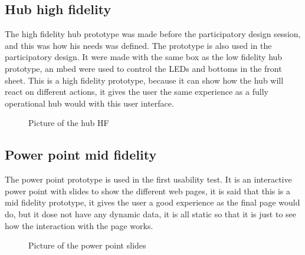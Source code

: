 \subsection{Hub high fidelity}
The high fidelity hub prototype was made before the participatory design session, and this was how his needs was defined. The prototype is also used in the participatory design. It were made with the same box as the low fidelity hub prototype, an mbed were used to control the LEDs and bottoms in the front sheet. This is a high fidelity prototype, because it can show how the hub will react on different actions, it gives the user the same experience as a fully operational hub would with this user interface.
\begin{figure}[H]
	\center
		\setlength\fboxsep{0pt}
		\setlength\fboxrule{1pt}
   	\caption{Picture of the hub HF}
   	\label{fig:High fidelity hub}
\end{figure}

\subsection{Power point mid fidelity}
The power point prototype is used in the first usability test. It is an interactive power point with slides to show the different web pages, it is said that this is a mid fidelity prototype, it gives the user a good experience as the final page would do, but it dose not have any dynamic data, it is all static so that it is just to see how the interaction with the page works.
\begin{figure}[H]
	\center
		\setlength\fboxsep{0pt}
		\setlength\fboxrule{1pt}
   	\caption{Picture of the power point slides}
   	\label{fig:web_interface1}
\end{figure}

